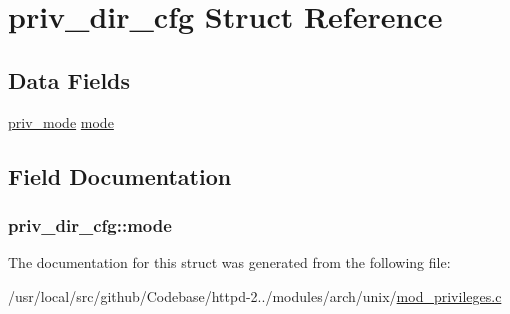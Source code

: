 \hypertarget{structpriv__dir__cfg}{}\section{priv\+\_\+dir\+\_\+cfg Struct Reference}
\label{structpriv__dir__cfg}
\subsection*{Data Fields}
\begin{DoxyCompactItemize}
\item 
\hyperlink{mod__privileges_8c_a8d87ee50f52a9b97e8822a782e862596}{priv\+\_\+mode} \hyperlink{structpriv__dir__cfg_acee0f9e1aed03ba0033711f3dad32285}{mode}
\end{DoxyCompactItemize}


\subsection{Field Documentation}
\subsubsection[{\texorpdfstring{mode}{mode}}]{ priv\+\_\+dir\+\_\+cfg\+::mode}\hypertarget{structpriv__dir__cfg_acee0f9e1aed03ba0033711f3dad32285}{}\label{structpriv__dir__cfg_acee0f9e1aed03ba0033711f3dad32285}


The documentation for this struct was generated from the following file\+:\begin{DoxyCompactItemize}
\item 
/usr/local/src/github/\+Codebase/httpd-\/2../modules/arch/unix/\hyperlink{mod__privileges_8c}{mod\+\_\+privileges.\+c}\end{DoxyCompactItemize}
